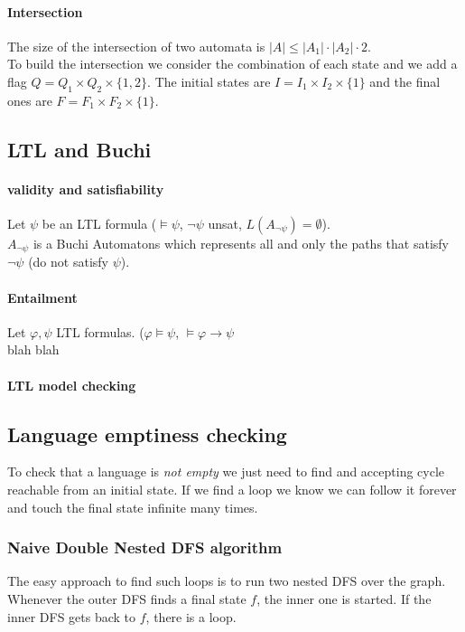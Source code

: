 \documentclass{article}
\begin{document}
\paragraph{Intersection}
The size of the intersection of two automata is $|A| \leq |A_1|\cdot|A_2|\cdot 2$.\\
To build the intersection we consider the combination of each state and we add a flag $Q=Q_1\times Q_2 \times \{1,2\}$. The initial states are $I=I_1\times I_2\times \{1\}$ and the final ones are $F=F_1\times F_2\times \{1\}$.

\subsection{LTL and Buchi}
\paragraph{validity and satisfiability}
Let $\psi$ be an LTL formula ($\models \psi$, $\neg\psi$ unsat, $L(A_{\neg\psi})=\emptyset$).\\
$A_{\neg\psi}$ is a Buchi Automatons which represents all and only the paths that satisfy $\neg\psi$ (do not satisfy $\psi$).

\paragraph{Entailment}
Let $\varphi,\psi$ LTL formulas. ($\varphi\models\psi$, $\models\varphi\to\psi$\\
blah blah

\paragraph{LTL model checking}

\subsection{Language emptiness checking}
To check that a language is \textit{not empty} we just need to find and accepting cycle reachable from an initial state. If we find a loop we know we can follow it forever and touch the final state infinite many times.

\subsubsection{Naive Double Nested DFS algorithm}
The easy approach to find such loops is to run two nested DFS over the graph. Whenever the outer DFS finds a final state $f$, the inner one is started. If the inner DFS gets back to $f$, there is a loop.
\end{document}
